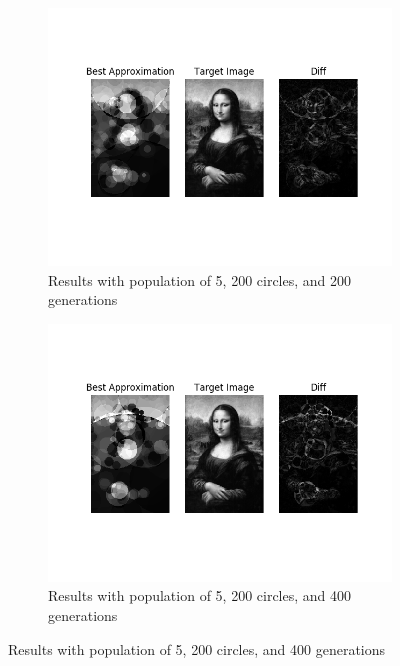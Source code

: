 \documentclass{article}
\begin{document}
\begin{figure}[H]
    \centering
    \begin{subfigure}[b]{0.45\textwidth}
        \centering
        \includegraphics[width=\textwidth]{output/bs-p5c200g200.png}
        \caption{Results with population of 5, 200 circles, and 200 generations}
    \end{subfigure}
    \begin{subfigure}[b]{0.45\textwidth}
        \centering
        \includegraphics[width=\textwidth]{output/bs-p5c200g400.png}
        \caption{Results with population of 5, 200 circles, and 400 generations}
    \end{subfigure}
\end{figure}
\end{document}
